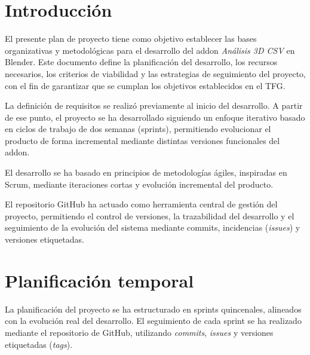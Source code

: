 \section{Introducción}

El presente plan de proyecto tiene como objetivo establecer las bases organizativas y metodológicas para el desarrollo del addon \textit{Análisis 3D CSV} en Blender. Este documento define la planificación del desarrollo, los recursos necesarios, los criterios de viabilidad y las estrategias de seguimiento del proyecto, con el fin de garantizar que se cumplan los objetivos establecidos en el TFG.

La definición de requisitos se realizó previamente al inicio del desarrollo. A partir de ese punto, el proyecto se ha desarrollado siguiendo un enfoque iterativo basado en ciclos de trabajo de dos semanas (sprints), permitiendo evolucionar el producto de forma incremental mediante distintas versiones funcionales del addon.

El desarrollo se ha basado en principios de metodologías ágiles, inspiradas en Scrum, mediante iteraciones cortas y evolución incremental del producto.

El repositorio GitHub ha actuado como herramienta central de gestión del proyecto, permitiendo el control de versiones, la trazabilidad del desarrollo y el seguimiento de la evolución del sistema mediante commits, incidencias (\textit{issues}) y versiones etiquetadas.

\section{Planificación temporal}

La planificación del proyecto se ha estructurado en sprints quincenales, alineados con la evolución real del desarrollo. El seguimiento de cada sprint se ha realizado mediante el repositorio de GitHub, utilizando \textit{commits}, \textit{issues} y versiones etiquetadas (\textit{tags}).

